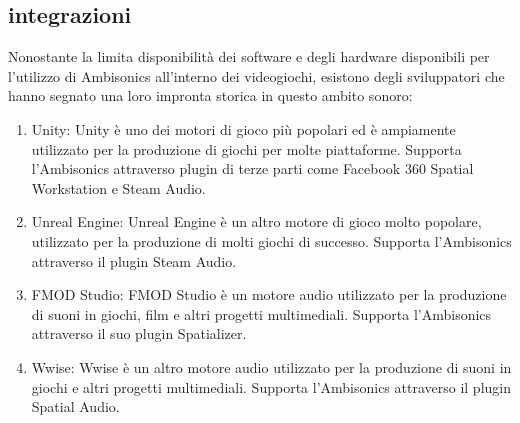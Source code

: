 \subsection{integrazioni}

Nonostante la limita disponibilità dei software e degli hardware disponibili per l'utilizzo di Ambisonics all'interno
dei videogiochi, esistono degli sviluppatori che hanno segnato una loro impronta storica in questo ambito sonoro:

\begin{enumerate}
      \item Unity: Unity è uno dei motori di gioco più popolari ed è ampiamente utilizzato per la produzione di giochi per molte piattaforme. Supporta l'Ambisonics attraverso plugin di terze parti come Facebook 360 Spatial Workstation e Steam Audio.
      \item Unreal Engine: Unreal Engine è un altro motore di gioco molto popolare, utilizzato per la produzione di molti giochi di successo. Supporta l'Ambisonics attraverso il plugin Steam Audio.
      \item FMOD Studio: FMOD Studio è un motore audio utilizzato per la produzione di suoni in giochi, film e altri progetti multimediali. Supporta l'Ambisonics attraverso il suo plugin Spatializer.
      \item Wwise: Wwise è un altro motore audio utilizzato per la produzione di suoni in giochi e altri progetti multimediali. Supporta l'Ambisonics attraverso il plugin Spatial Audio.
\end{enumerate}
